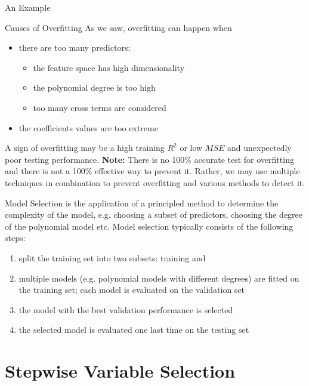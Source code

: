 \documentclass[12pt,t]{beamer}
\let\emph\relax %
\begin{document}
\begin{frame}{An Example} 
\end{frame}

\begin{frame}{Causes of Overfitting} 
\vskip-0.4cm
As we saw, overfitting can happen when
\vskip0.2cm
\begin{itemize}
\item there are too many predictors:
\begin{itemize}
\item the feature space has high dimensionality
\item the polynomial degree is too high
\item too many cross terms are considered
\end{itemize}
\item the coefficients values are too extreme
\end{itemize}
\vskip0.2cm
A sign of overfitting may be a high training $R^2$ or low $MSE$ and unexpectedly poor testing performance. 
\vskip0.2cm
\textbf{Note:} There is no 100\% accurate test for overfitting and there is not a 100\% effective way to prevent it. Rather, we may use multiple techniques in combination to prevent overfitting and various methods to detect it.
\end{frame}

\begin{frame}{Model Selection} \small
\vskip-0.4cm
\emph{Model selection} is the application of a principled method to determine the complexity of the model, e.g. choosing a subset of predictors, choosing the degree of the polynomial model etc.
\vskip0.2cm
Model selection typically consists of the following steps:
\begin{enumerate}
\item split the training set into two subsets: training and \emph{validation}
\item multiple models (e.g. polynomial models with different degrees) are fitted on the training set; each model is evaluated on the validation set
\item the model with the best validation performance is selected
\item the selected model is evaluated one last time on the testing set
\end{enumerate}
\end{frame}

\section{Stepwise Variable Selection}
\end{document}

